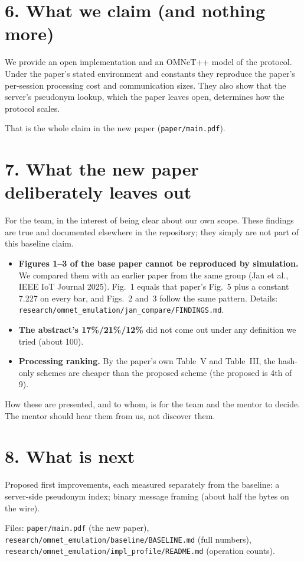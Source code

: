 \documentclass[11pt]{article}
\begin{document}
\section*{6. What we claim (and nothing more)}
\begin{key}
We provide an open implementation and an OMNeT++ model of the protocol. Under the paper's stated environment and constants they reproduce the paper's per-session processing cost and communication sizes. They also show that the server's pseudonym lookup, which the paper leaves open, determines how the protocol scales.
\end{key}
That is the whole claim in the new paper (\texttt{paper/main.pdf}).

\section*{7. What the new paper deliberately leaves out}
For the team, in the interest of being clear about our own scope. These findings are true and documented elsewhere in the repository; they simply are not part of this baseline claim.
\begin{itemize}[leftmargin=1.4em,itemsep=2pt]
\item \textbf{Figures 1--3 of the base paper cannot be reproduced by simulation.} We compared them with an earlier paper from the same group (Jan et al., IEEE IoT Journal 2025). Fig.~1 equals that paper's Fig.~5 plus a constant 7.227 on every bar, and Figs.~2 and~3 follow the same pattern. Details: \texttt{research/omnet\_emulation/jan\_compare/FINDINGS.md}.
\item \textbf{The abstract's 17\%/21\%/12\%} did not come out under any definition we tried (about 100).
\item \textbf{Processing ranking.} By the paper's own Table~V and Table~III, the hash-only schemes are cheaper than the proposed scheme (the proposed is 4th of 9).
\end{itemize}
How these are presented, and to whom, is for the team and the mentor to decide. The mentor should hear them from us, not discover them.

\section*{8. What is next}
Proposed first improvements, each measured separately from the baseline: a server-side pseudonym index; binary message framing (about half the bytes on the wire).

\vfill\small Files: \texttt{paper/main.pdf} (the new paper), \texttt{research/omnet\_emulation/baseline/BASELINE.md} (full numbers), \texttt{research/omnet\_emulation/impl\_profile/README.md} (operation counts).
\end{document}
